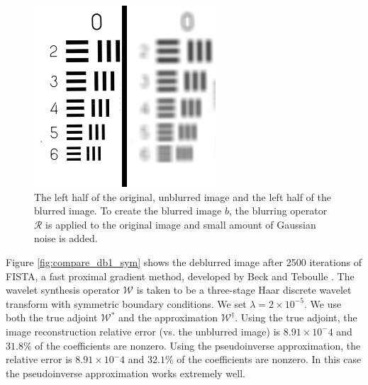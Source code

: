 \documentclass[journal]{IEEEtran}
\begin{document}

\begin{figure}
   \centering
   \includegraphics[width=0.8\columnwidth]{figures/resolution_blurred_figure.png}
   \caption{The left half of the original, unblurred image and the left half of the blurred image.  To create the blurred image $b$, the blurring operator $\mathcal{R}$ is applied to the original image and small amount of Gaussian noise is added.}
   \label{fig:original}
\end{figure}

Figure \ref{fig:compare_db1_sym} shows the deblurred image after 2500 iterations of FISTA, a fast proximal gradient method, developed by Beck and Teboulle \cite{beck_2009}.  The wavelet synthesis operator $\mathcal{W}$ is taken to be a three-stage Haar discrete wavelet transform with symmetric boundary conditions.  We set $\lambda=2\times 10^{-5}$.  We use both the true adjoint $\mathcal{W}^\ast$ and the approximation $\mathcal{W}^\dagger$.  Using the true adjoint, the image reconstruction relative error (vs. the unblurred image) is $8.91\times10^-4$ and $31.8\%$ of the coefficients are nonzero.  Using the pseudoinverse approximation, the relative error is $8.91\times 10^-4$ and $32.1\%$ of the coefficients are nonzero.  In this case the pseudoinverse approximation works extremely well.
\end{document}

